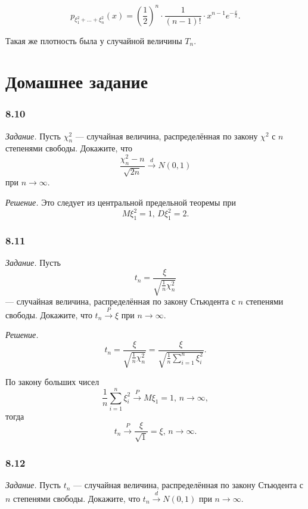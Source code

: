 $$p_{ \xi_1^2 + \dotsc + \xi_n^2} \left( x \right) =
  \left( \frac{1}{2} \right)^n \cdot \frac{1}{ \left( n - 1 \right)!} \cdot
  x^{n - 1} e^{- \frac{x}{2}}.$$

Такая же плотность была у случайной величины $T_n$.

\section*{Домашнее задание}

\subsubsection*{8.10}

\textit{Задание.}
Пусть $ \chi_n^2$ --- случайная величина,
распределённая по закону $ \chi^2$ с $n$ степенями свободы.
Докажите, что
$$ \frac{ \chi_n^2 - n}{ \sqrt{2n}} \overset{d}{ \rightarrow}
  N \left( 0, 1 \right) $$
при $n \to \infty $.

\textit{Решение.}
Это следует из центральной предельной теоремы при
$$M \xi_1^2 = 1, \,
  D \xi_1^2 = 2.$$


\subsubsection*{8.11}

\textit{Задание.} Пусть
$$t_n =
  \frac{ \xi }{ \sqrt{ \frac{1}{n} \chi_n^2}}$$
--- случайная величина, распределённая по закону Стьюдента с $n$ степенями свободы.
Докажите, что $t_n \overset{P}{ \rightarrow } \xi $ при $n \to \infty $.

\textit{Решение.}
$$t_n =
  \frac{ \xi }{ \sqrt{ \frac{1}{n} \chi_n^2}} =
  \frac{ \xi }{ \sqrt{ \frac{1}{n} \sum \limits_{i = 1}^n \xi_i^2}}.$$

По закону больших чисел
$$ \frac{1}{n} \sum \limits_{i = 1}^n  \xi_i^2 \overset{P}{ \rightarrow }
  M \xi_1 =
  1, \,
  n \to \infty,$$
тогда
$$t_n \overset{P}{ \rightarrow } \frac{ \xi }{ \sqrt{1}} = \xi, \,
  n \to \infty.$$

\subsubsection*{8.12}

\textit{Задание.}
Пусть $t_n$ --- случайная величина, распределённая по закону Стьюдента с $n$ степенями свободы.
Докажите, что $t_n \overset{d}{ \rightarrow } N \left( 0, 1 \right) $ при $n \to \infty $.

